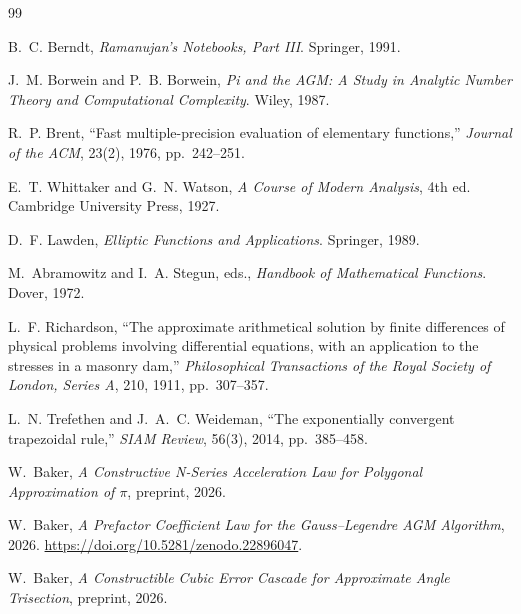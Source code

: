 \documentclass[11pt]{article}
\begin{document}
\begin{thebibliography}{99}

B.~C. Berndt, \emph{Ramanujan's Notebooks, Part III}. Springer, 1991.

J.~M. Borwein and P.~B. Borwein,
\emph{Pi and the AGM: A Study in Analytic Number Theory and Computational
Complexity}. Wiley, 1987.

R.~P. Brent,
``Fast multiple-precision evaluation of elementary functions,''
\emph{Journal of the ACM}, 23(2), 1976, pp.~242--251.

E.~T. Whittaker and G.~N. Watson,
\emph{A Course of Modern Analysis}, 4th ed. Cambridge University Press, 1927.

D.~F. Lawden, \emph{Elliptic Functions and Applications}. Springer, 1989.

M.~Abramowitz and I.~A. Stegun, eds.,
\emph{Handbook of Mathematical Functions}. Dover, 1972.

L.~F. Richardson,
``The approximate arithmetical solution by finite differences of physical
problems involving differential equations, with an application to the stresses
in a masonry dam,''
\emph{Philosophical Transactions of the Royal Society of London, Series A},
210, 1911, pp.~307--357.

L.~N. Trefethen and J.~A.~C. Weideman,
``The exponentially convergent trapezoidal rule,''
\emph{SIAM Review}, 56(3), 2014, pp.~385--458.

W.~Baker,
\emph{A Constructive N-Series Acceleration Law for Polygonal Approximation of
$\pi$}, preprint, 2026.

W.~Baker,
\emph{A Prefactor Coefficient Law for the Gauss--Legendre AGM Algorithm},
2026. \url{https://doi.org/10.5281/zenodo.22896047}.

W.~Baker,
\emph{A Constructible Cubic Error Cascade for Approximate Angle Trisection},
preprint, 2026.

\end{thebibliography}
\end{document}
